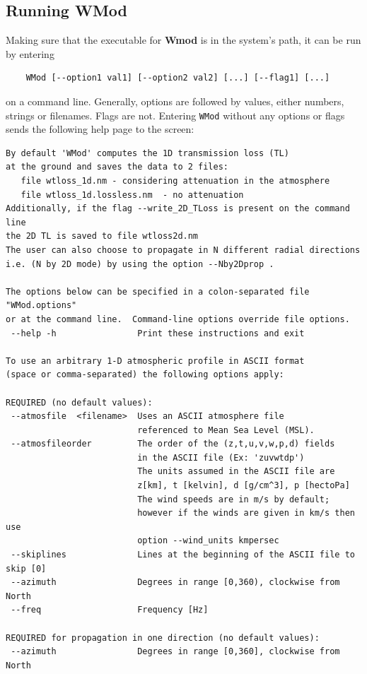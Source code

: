 \subsection{Running WMod}
\label{sec:running wmod}

Making sure that the executable for {\bf Wmod} is in the system's path, it can be run by entering 
\begin{verbatim} 
    WMod [--option1 val1] [--option2 val2] [...] [--flag1] [...] 
\end{verbatim}
on a command line. Generally, options are followed by values, either numbers, strings or filenames. Flags are not. Entering \verb"WMod" without any options or flags sends the following help page to the screen: 

\begin{verbatim}
By default 'WMod' computes the 1D transmission loss (TL)
at the ground and saves the data to 2 files:
   file wtloss_1d.nm - considering attenuation in the atmosphere
   file wtloss_1d.lossless.nm  - no attenuation
Additionally, if the flag --write_2D_TLoss is present on the command line 
the 2D TL is saved to file wtloss2d.nm
The user can also choose to propagate in N different radial directions
i.e. (N by 2D mode) by using the option --Nby2Dprop .

The options below can be specified in a colon-separated file "WMod.options"
or at the command line.  Command-line options override file options.
 --help -h                Print these instructions and exit

To use an arbitrary 1-D atmospheric profile in ASCII format
(space or comma-separated) the following options apply:

REQUIRED (no default values):
 --atmosfile  <filename>  Uses an ASCII atmosphere file
                          referenced to Mean Sea Level (MSL).
 --atmosfileorder         The order of the (z,t,u,v,w,p,d) fields
                          in the ASCII file (Ex: 'zuvwtdp')
                          The units assumed in the ASCII file are
                          z[km], t [kelvin], d [g/cm^3], p [hectoPa]
                          The wind speeds are in m/s by default;
                          however if the winds are given in km/s then use
                          option --wind_units kmpersec
 --skiplines              Lines at the beginning of the ASCII file to skip [0]
 --azimuth                Degrees in range [0,360), clockwise from North
 --freq                   Frequency [Hz]

REQUIRED for propagation in one direction (no default values):
 --azimuth                Degrees in range [0,360], clockwise from North


\end{verbatim}
